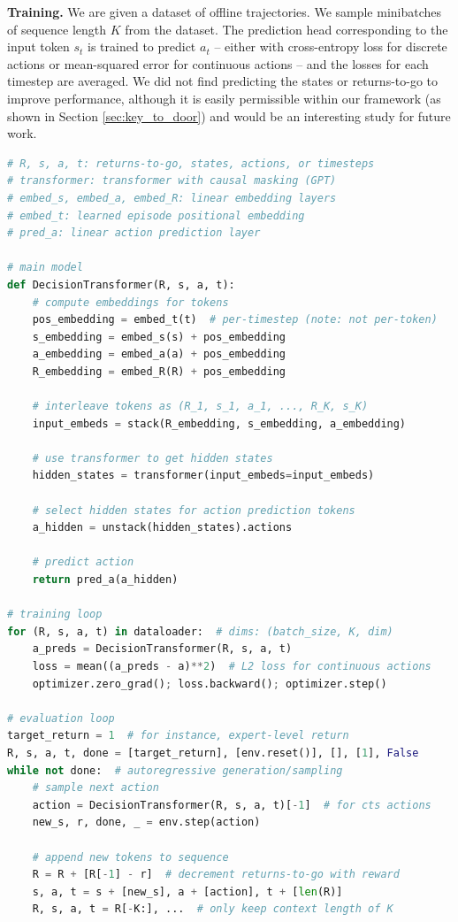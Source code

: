 \textbf{Training.}
We are given a dataset of offline trajectories.
We sample minibatches of sequence length $K$ from the dataset.
The prediction head corresponding to the input token $s_t$ is trained to predict $a_t$ -- either with cross-entropy loss for discrete actions or mean-squared error for continuous actions -- and the losses for each timestep are averaged.
We did not find predicting the states or returns-to-go to improve performance, although
it is easily permissible within our framework (as shown in Section \ref{sec:key_to_door}) and would be an interesting study for future work.

\begin{algorithm}[hb]
\caption{Decision Transformer Pseudocode (for continuous actions)}
\label{alg:decisiontransformer}
\begin{lstlisting}[language=python]
# R, s, a, t: returns-to-go, states, actions, or timesteps
# transformer: transformer with causal masking (GPT)
# embed_s, embed_a, embed_R: linear embedding layers
# embed_t: learned episode positional embedding
# pred_a: linear action prediction layer

# main model
def DecisionTransformer(R, s, a, t):
    # compute embeddings for tokens
    pos_embedding = embed_t(t)  # per-timestep (note: not per-token)
    s_embedding = embed_s(s) + pos_embedding
    a_embedding = embed_a(a) + pos_embedding
    R_embedding = embed_R(R) + pos_embedding
    
    # interleave tokens as (R_1, s_1, a_1, ..., R_K, s_K)
    input_embeds = stack(R_embedding, s_embedding, a_embedding)
    
    # use transformer to get hidden states
    hidden_states = transformer(input_embeds=input_embeds)
    
    # select hidden states for action prediction tokens
    a_hidden = unstack(hidden_states).actions
    
    # predict action
    return pred_a(a_hidden)

# training loop
for (R, s, a, t) in dataloader:  # dims: (batch_size, K, dim)
    a_preds = DecisionTransformer(R, s, a, t)
    loss = mean((a_preds - a)**2)  # L2 loss for continuous actions
    optimizer.zero_grad(); loss.backward(); optimizer.step()

# evaluation loop
target_return = 1  # for instance, expert-level return
R, s, a, t, done = [target_return], [env.reset()], [], [1], False
while not done:  # autoregressive generation/sampling
    # sample next action
    action = DecisionTransformer(R, s, a, t)[-1]  # for cts actions
    new_s, r, done, _ = env.step(action)
    
    # append new tokens to sequence
    R = R + [R[-1] - r]  # decrement returns-to-go with reward
    s, a, t = s + [new_s], a + [action], t + [len(R)]
    R, s, a, t = R[-K:], ...  # only keep context length of K
\end{lstlisting}
\end{algorithm}
